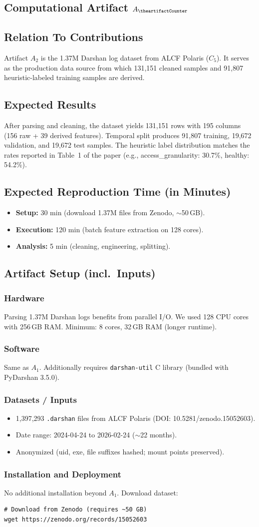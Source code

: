 \documentclass[conference]{IEEEtran}
\newcounter{artifactCounter}
\newcommand{\newartifact}{%
    \stepcounter{artifactCounter}%
    \subsection{Computational Artifact $A_{\theartifactCounter}$}%
}
\newcommand{\artrel}{\subsection*{Relation To Contributions}}
\newcommand{\artexp}{\subsection*{Expected Results}}
\newcommand{\arttime}{\subsection*{Expected Reproduction Time (in Minutes)}}
\newcommand{\artin}{\subsection*{Artifact Setup (incl.\ Inputs)}}
\newcommand{\artinpart}[1]{\subsubsection*{#1}}
\begin{document}
\newartifact

\artrel
Artifact $A_2$ is the 1.37M Darshan log dataset from ALCF Polaris
($C_5$). It serves as the production data source from which 131{,}151
cleaned samples and 91{,}807 heuristic-labeled training samples are derived.

\artexp
After parsing and cleaning, the dataset yields 131{,}151 rows with
195 columns (156 raw + 39 derived features). Temporal split produces
91{,}807 training, 19{,}672 validation, and 19{,}672 test samples.
The heuristic label distribution matches the rates reported in
Table~1 of the paper (e.g., access\_granularity: 30.7\%,
healthy: 54.2\%).

\arttime
\begin{itemize}
\item \textbf{Setup:} 30 min (download 1.37M files from Zenodo, $\sim$50\,GB).
\item \textbf{Execution:} 120 min (batch feature extraction on 128 cores).
\item \textbf{Analysis:} 5 min (cleaning, engineering, splitting).
\end{itemize}

\artin

\artinpart{Hardware}
Parsing 1.37M Darshan logs benefits from parallel I/O. We used 128 CPU
cores with 256\,GB RAM. Minimum: 8 cores, 32\,GB RAM (longer runtime).

\artinpart{Software}
Same as $A_1$. Additionally requires \texttt{darshan-util} C library
(bundled with PyDarshan 3.5.0).

\artinpart{Datasets / Inputs}
\begin{itemize}
\item 1{,}397{,}293 \texttt{.darshan} files from ALCF Polaris
(DOI: 10.5281/zenodo.15052603).
\item Date range: 2024-04-24 to 2026-02-24 ($\sim$22 months).
\item Anonymized (uid, exe, file suffixes hashed; mount points preserved).
\end{itemize}

\artinpart{Installation and Deployment}
No additional installation beyond $A_1$. Download dataset:
\begin{verbatim}
# Download from Zenodo (requires ~50 GB)
wget https://zenodo.org/records/15052603
\end{verbatim}
\end{document}
